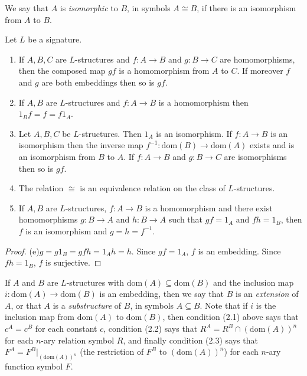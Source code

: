 We say that \( A \) is \emph{isomorphic} to \( B \), in symbols \( A \cong B \), if there is an isomorphism from \( A \) to \( B \).


\begin{theorem}
    \label{thm:homomorphism-basics}
    Let \( L \) be a signature.
    \begin{enumerate}
        \item[(a)] If \( A, B, C \) are \( L \)-structures and \( f\colon A \to B \) and \( g\colon B \to C \) are homomorphisms, then the composed map \( gf \) is a homomorphism from \( A \) to \( C \). If moreover \( f \) and \( g \) are both embeddings then so is \( gf \).

        \item[(b)] If \( A, B \) are \( L \)-structures and \( f\colon A \to B \) is a homomorphism then \( 1_B f = f = f 1_A \).

        \item[(c)] Let \( A, B, C \) be \( L \)-structures. Then \( 1_A \) is an isomorphism. If \( f\colon A \to B \) is an isomorphism then the inverse map \( f^{-1}\colon \mathrm{dom}(B) \to \mathrm{dom}(A) \) exists and is an isomorphism from \( B \) to \( A \). If \( f\colon A \to B \) and \( g\colon B \to C \) are isomorphisms then so is \( gf \).

        \item[(d)] The relation \( \cong \) is an equivalence relation on the class of \( L \)-structures.

        \item[(e)] If \( A, B \) are \( L \)-structures, \( f\colon A \to B \) is a homomorphism and there exist homomorphisms \( g\colon B \to A \) and \( h\colon B \to A \) such that \( gf = 1_A \) and \( fh = 1_B \), then \( f \) is an isomorphism and \( g = h = f^{-1} \).
    \end{enumerate}
\end{theorem}

\begin{proof}
    (e)\quad \( g = g 1_B = gfh = 1_A h = h \). Since \( gf = 1_A \), \( f \) is an embedding. Since \( fh = 1_B \), \( f \) is surjective.
\end{proof}




\begin{definition}
    If \( A \) and \( B \) are \( L \)-structures with \( \mathrm{dom}(A) \subseteq \mathrm{dom}(B) \) and the inclusion map \( i\colon \mathrm{dom}(A) \to \mathrm{dom}(B) \) is an embedding, then we say that \( B \) is an \emph{extension} of \( A \), or that \( A \) is a \emph{substructure} of \( B \), in symbols \( A \subseteq B \). Note that if \( i \) is the inclusion map from \( \mathrm{dom}(A) \) to \( \mathrm{dom}(B) \), then condition (2.1) above says that \( c^A = c^B \) for each constant \( c \), condition (2.2) says that \( R^A = R^B \cap (\mathrm{dom}(A))^n \) for each \( n \)-ary relation symbol \( R \), and finally condition (2.3) says that \( F^A = F^B|_{(\mathrm{dom}(A))^n} \) (the restriction of \( F^B \) to \( (\mathrm{dom}(A))^n \)) for each \( n \)-ary function symbol \( F \).
\end{definition}


